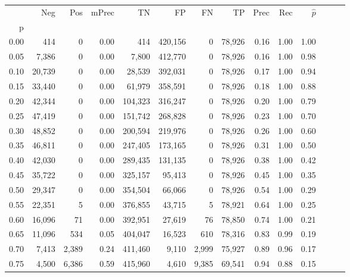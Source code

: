 \begin{tabular}{rrrrrrrrrrrrrr}
\toprule
{} &     Neg &     Pos & mPrec &       TN &       FP &      FN &      TP &  Prec &   Rec & $\hat{p}$ \\
p    &         &         &       &          &          &         &         &       &       &           \\
\midrule
0.00 &     414 &       0 &  0.00 &      414 &  420,156 &       0 &  78,926 &  0.16 &  1.00 &      1.00 \\
0.05 &   7,386 &       0 &  0.00 &    7,800 &  412,770 &       0 &  78,926 &  0.16 &  1.00 &      0.98 \\
0.10 &  20,739 &       0 &  0.00 &   28,539 &  392,031 &       0 &  78,926 &  0.17 &  1.00 &      0.94 \\
0.15 &  33,440 &       0 &  0.00 &   61,979 &  358,591 &       0 &  78,926 &  0.18 &  1.00 &      0.88 \\
0.20 &  42,344 &       0 &  0.00 &  104,323 &  316,247 &       0 &  78,926 &  0.20 &  1.00 &      0.79 \\
0.25 &  47,419 &       0 &  0.00 &  151,742 &  268,828 &       0 &  78,926 &  0.23 &  1.00 &      0.70 \\
0.30 &  48,852 &       0 &  0.00 &  200,594 &  219,976 &       0 &  78,926 &  0.26 &  1.00 &      0.60 \\
0.35 &  46,811 &       0 &  0.00 &  247,405 &  173,165 &       0 &  78,926 &  0.31 &  1.00 &      0.50 \\
0.40 &  42,030 &       0 &  0.00 &  289,435 &  131,135 &       0 &  78,926 &  0.38 &  1.00 &      0.42 \\
0.45 &  35,722 &       0 &  0.00 &  325,157 &   95,413 &       0 &  78,926 &  0.45 &  1.00 &      0.35 \\
0.50 &  29,347 &       0 &  0.00 &  354,504 &   66,066 &       0 &  78,926 &  0.54 &  1.00 &      0.29 \\
0.55 &  22,351 &       5 &  0.00 &  376,855 &   43,715 &       5 &  78,921 &  0.64 &  1.00 &      0.25 \\
0.60 &  16,096 &      71 &  0.00 &  392,951 &   27,619 &      76 &  78,850 &  0.74 &  1.00 &      0.21 \\
0.65 &  11,096 &     534 &  0.05 &  404,047 &   16,523 &     610 &  78,316 &  0.83 &  0.99 &      0.19 \\
0.70 &   7,413 &   2,389 &  0.24 &  411,460 &    9,110 &   2,999 &  75,927 &  0.89 &  0.96 &      0.17 \\
0.75 &   4,500 &   6,386 &  0.59 &  415,960 &    4,610 &   9,385 &  69,541 &  0.94 &  0.88 &      0.15 \\

\end{tabular}
